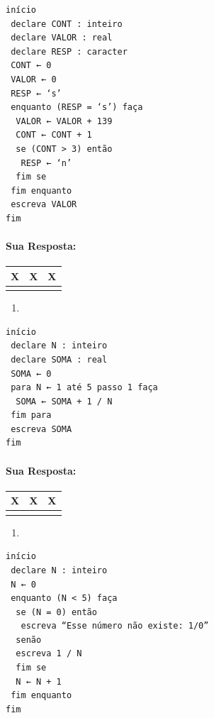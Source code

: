 \documentclass[12pt,a4paper]{article}
\providecommand{\tightlist}{%
      \setlength{\itemsep}{0pt}\setlength{\parskip}{0pt}}
\begin{document}
\begin{verbatim}
início
 declare CONT : inteiro
 declare VALOR : real
 declare RESP : caracter
 CONT ← 0
 VALOR ← 0
 RESP ← ‘s’
 enquanto (RESP = ‘s’) faça
  VALOR ← VALOR + 139
  CONT ← CONT + 1
  se (CONT > 3) então
   RESP ← ‘n’
  fim se
 fim enquanto
 escreva VALOR
fim
\end{verbatim}

    \hypertarget{sua-resposta}{%
\paragraph{Sua Resposta:}\label{sua-resposta}}

\begin{longtable}[]{@{}ccc@{}}
\toprule
X & X & X\tabularnewline
\midrule
\endhead
& &\tabularnewline
\bottomrule
\end{longtable}

    \begin{enumerate}
\def\labelenumi{\alph{enumi})}
\setcounter{enumi}{6}
\tightlist
\item
\end{enumerate}

\begin{verbatim}
início
 declare N : inteiro
 declare SOMA : real
 SOMA ← 0
 para N ← 1 até 5 passo 1 faça
  SOMA ← SOMA + 1 / N
 fim para
 escreva SOMA
fim 
\end{verbatim}

    \hypertarget{sua-resposta}{%
\paragraph{Sua Resposta:}\label{sua-resposta}}

\begin{longtable}[]{@{}ccc@{}}
\toprule
X & X & X\tabularnewline
\midrule
\endhead
& &\tabularnewline
\bottomrule
\end{longtable}

    \begin{enumerate}
\def\labelenumi{\alph{enumi})}
\setcounter{enumi}{7}
\tightlist
\item
\end{enumerate}

\begin{verbatim}
início
 declare N : inteiro
 N ← 0
 enquanto (N < 5) faça
  se (N = 0) então
   escreva “Esse número não existe: 1/0”
  senão
  escreva 1 / N
  fim se
  N ← N + 1
 fim enquanto
fim 
\end{verbatim}
\end{document}
